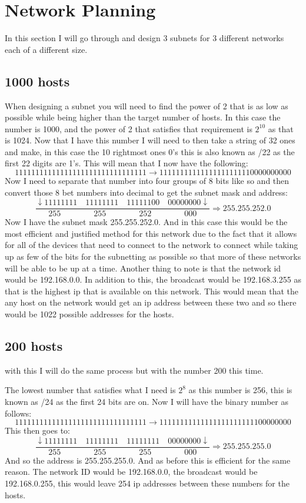 \documentclass{article}
\begin{document}
\section{Network Planning}
In this section I will go through and design 3 subnets for 3 different networks each of a different size.
\subsection{1000 hosts}
When designing a subnet you will need to find the power of 2 that is as low as possible while being higher than the target number of hosts. In this case the number is 1000, and the power of 2 that satisfies that requirement is $2^{10}$ as that is 1024. Now that I have this number I will need to then take a string of 32 ones and make, in this case the 10 rightmost ones 0's this is also known as /22 as the first 22 digits are 1's. This will mean that I now have the following:
\[
	11111111111111111111111111111111 \rightarrow 11111111111111111111110000000000
\]
Now I need to separate that number into four groups of 8 bits like so and then convert those 8 bet numbers into decimal to get the subnet mask and address:
\[
	\frac{\downarrow11111111\quad11111111\quad11111100\quad00000000\downarrow}{255 \qquad \qquad 255 \qquad \qquad 252 \qquad \qquad 000} \Rightarrow 255.255.252.0
\]
Now I have the subnet mask 255.255.252.0. And in this case this would be the most efficient and justified method for this network due to the fact that it allows for all of the devices that need to connect to the network to connect while taking up as few of the bits for the subnetting as possible so that more of these networks will be able to be up at a time. 
Another thing to note is that the network id would be 192.168.0.0. In addition to this, the broadcast would be 192.168.3.255 as that is the highest ip that is available on this network. This would mean that the any host on the network would get an ip address between these two and so there would be 1022 possible addresses for the hosts. 
\subsection{200 hosts}
with this I will do the same process but with the number 200 this time. 
	
The lowest number that satisfies what I need is $2^{8}$ as this number is 256, this is known as /24 as the first 24 bits are on. Now I will have the binary number as follows:
\[
	11111111111111111111111111111111 \rightarrow 11111111111111111111111100000000
\]
This then goes to:
\[
	\frac{\downarrow11111111\quad11111111\quad11111111\quad00000000\downarrow}{255 \qquad \qquad 255 \qquad \qquad 255 \qquad \qquad 000} \Rightarrow 255.255.255.0
\]
And so the address is 255.255.255.0. And as before this is efficient for the same reason. 
The network ID would be 192.168.0.0, the broadcast would be 192.168.0.255, this would leave 254 ip addresses between these numbers for the hosts. 
\end{document}
